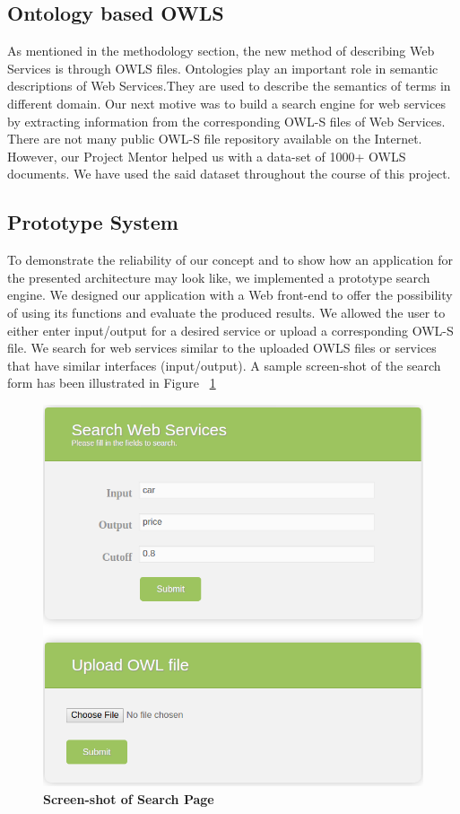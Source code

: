\documentclass[12pt, oneside]{book}
\begin{document}
\subsection{Ontology based OWLS}
As mentioned in the methodology section, the new method of describing Web Services is through OWLS files. Ontologies play an important role in semantic descriptions of Web Services.They are used to describe the semantics of terms in different domain. Our next motive was to build a search engine for web services by extracting information from the corresponding OWL-S files of Web Services. There are not many public OWL-S file repository available on the Internet. However, our Project Mentor helped us with a data-set of 1000+ OWLS documents. We have used the said dataset throughout the course of this project.\\

\subsection{Prototype System}
To demonstrate the reliability of our concept and to show how an application for the presented architecture may look like, we implemented a prototype search engine. We designed our application with a Web front-end to offer the possibility of using its functions and evaluate the produced results. We allowed the user to either enter input/output for a desired service or upload a corresponding OWL-S file. We search for web services similar to the uploaded OWLS files or services that have similar interfaces (input/output). A sample screen-shot of the search form has been illustrated in Figure ~\ref{fig: search} \\ \par
\begin{figure}[h]
 \centering
 \includegraphics[width=\textwidth]{pics/search.png}
 \caption{\textbf{Screen-shot of Search Page}}
 \label{fig: search}
\end{figure}
\end{document}
